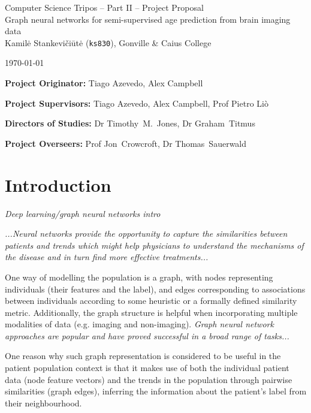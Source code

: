 \documentclass[12pt,a4paper,twoside]{article}
\begin{document}
\begin{center}
\Large
Computer Science Tripos -- Part II -- Project Proposal\\[4mm]
\LARGE
Graph neural networks for semi-supervised age prediction from brain imaging data \\[4mm]

\large
Kamilė Stankevičiūtė (\texttt{ks830}), Gonville \& Caius College

\today %
\end{center}

\vspace{5mm}
\textbf{Project Originator:} Tiago Azevedo, Alex Campbell

\textbf{Project Supervisors:} Tiago Azevedo, Alex Campbell, Prof Pietro Liò

\textbf{Directors of Studies:} Dr Timothy~M.~Jones, Dr Graham~Titmus

\textbf{Project Overseers:} Prof Jon~Crowcroft, Dr Thomas~Sauerwald


\section*{Introduction}

\textit{Deep learning/graph neural networks intro}

\textit{...Neural networks provide the opportunity to capture the similarities between patients and trends which might help physicians to understand the mechanisms of the disease and in turn find more effective treatments...}

One way of modelling the population is a graph, with nodes representing individuals (their features and the label), and edges corresponding to associations between individuals according to some heuristic or a formally defined similarity metric. Additionally, the graph structure is helpful when incorporating multiple modalities of data (e.g. imaging and non-imaging). \textit{Graph neural network approaches are popular and have proved successful in a broad range of tasks...}

One reason why such graph representation is considered to be useful in the patient population context is that it makes use of both the individual patient data (node feature vectors) and the trends in the population through pairwise similarities (graph edges), inferring the information about the patient's label from their neighbourhood.
\end{document}
